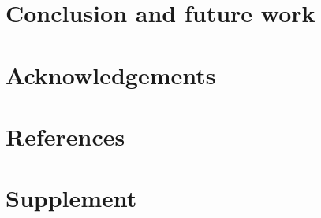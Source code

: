 \documentclass[review]{siamart0216}
\begin{document}


\section{Conclusion and future work}
\label{sec:conclusion}



\section{Acknowledgements}
\label{sec:acknowledgements}



\section{References}




\section{Supplement}


\end{document}
